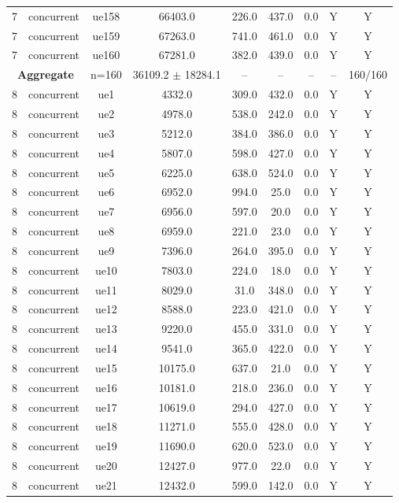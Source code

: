\begin{table}[ht]
\begin{tabular}{|c|c|c|c|c|c|c|c|c|}
7 & concurrent & ue158 & 66403.0 & 226.0 & 437.0 & 0.0 & Y & Y \\
7 & concurrent & ue159 & 67263.0 & 741.0 & 461.0 & 0.0 & Y & Y \\
7 & concurrent & ue160 & 67281.0 & 382.0 & 439.0 & 0.0 & Y & Y \\
\multicolumn{2}{|c|}{\textbf{Aggregate}} & n=160 & 36109.2 $\pm$ 18284.1 & -- & -- & -- & -- & 160/160 \\
\hline
8 & concurrent & ue1 & 4332.0 & 309.0 & 432.0 & 0.0 & Y & Y \\
8 & concurrent & ue2 & 4978.0 & 538.0 & 242.0 & 0.0 & Y & Y \\
8 & concurrent & ue3 & 5212.0 & 384.0 & 386.0 & 0.0 & Y & Y \\
8 & concurrent & ue4 & 5807.0 & 598.0 & 427.0 & 0.0 & Y & Y \\
8 & concurrent & ue5 & 6225.0 & 638.0 & 524.0 & 0.0 & Y & Y \\
8 & concurrent & ue6 & 6952.0 & 994.0 & 25.0 & 0.0 & Y & Y \\
8 & concurrent & ue7 & 6956.0 & 597.0 & 20.0 & 0.0 & Y & Y \\
8 & concurrent & ue8 & 6959.0 & 221.0 & 23.0 & 0.0 & Y & Y \\
8 & concurrent & ue9 & 7396.0 & 264.0 & 395.0 & 0.0 & Y & Y \\
8 & concurrent & ue10 & 7803.0 & 224.0 & 18.0 & 0.0 & Y & Y \\
8 & concurrent & ue11 & 8029.0 & 31.0 & 348.0 & 0.0 & Y & Y \\
8 & concurrent & ue12 & 8588.0 & 223.0 & 421.0 & 0.0 & Y & Y \\
8 & concurrent & ue13 & 9220.0 & 455.0 & 331.0 & 0.0 & Y & Y \\
8 & concurrent & ue14 & 9541.0 & 365.0 & 422.0 & 0.0 & Y & Y \\
8 & concurrent & ue15 & 10175.0 & 637.0 & 21.0 & 0.0 & Y & Y \\
8 & concurrent & ue16 & 10181.0 & 218.0 & 236.0 & 0.0 & Y & Y \\
8 & concurrent & ue17 & 10619.0 & 294.0 & 427.0 & 0.0 & Y & Y \\
8 & concurrent & ue18 & 11271.0 & 555.0 & 428.0 & 0.0 & Y & Y \\
8 & concurrent & ue19 & 11690.0 & 620.0 & 523.0 & 0.0 & Y & Y \\
8 & concurrent & ue20 & 12427.0 & 977.0 & 22.0 & 0.0 & Y & Y \\
8 & concurrent & ue21 & 12432.0 & 599.0 & 142.0 & 0.0 & Y & Y \\

\end{tabular}
\end{table}

